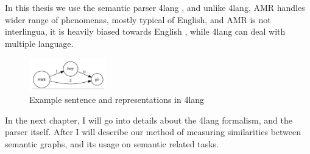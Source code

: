In this thesis we use the semantic parser 4lang \cite{Recski:2015b}, and unlike 4lang, AMR handles wider range of phenomenas, mostly typical of English, and AMR is not interlingua, it is heavily biased towards English \cite{Palmer:2005}, while 4lang can deal with multiple language.

\begin{figure}[h]
	\centering
	\includegraphics[width=0.3\textwidth]{figures/4langboy}
	\caption{Example sentence and representations in 4lang}
	\label{fig:4langboy}
\end{figure}

In the next chapter, I will go into details about the 4lang formalism, and the parser itself. After I will describe our method of measuring similarities between semantic graphs, and its usage on semantic related tasks.